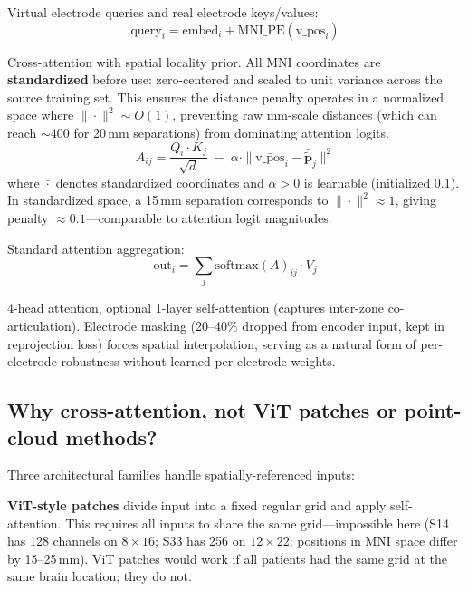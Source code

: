 \documentclass[11pt,letterpaper]{article}
\newcommand{\bfp}{\mathbf{p}}
\begin{document}
Virtual electrode queries and real electrode keys/values:
\begin{equation}
\text{query}_i = \text{embed}_i + \text{MNI\_PE}(\text{v\_pos}_i)
\end{equation}

Cross-attention with spatial locality prior. All MNI coordinates are \textbf{standardized} before use: zero-centered and scaled to unit variance across the source training set. This ensures the distance penalty operates in a normalized space where $\|\cdot\|^2 \sim O(1)$, preventing raw mm-scale distances (which can reach ${\sim}400$ for 20\,mm separations) from dominating attention logits.
\begin{equation}
\boxed{A_{ij} = \frac{Q_i \cdot K_j}{\sqrt{d}} \;-\; \alpha \cdot \|\bar{\text{v\_pos}}_i - \bar{\tilde{\bfp}}_j\|^2}
\end{equation}
where $\bar{\cdot}$ denotes standardized coordinates and $\alpha > 0$ is learnable (initialized 0.1). In standardized space, a 15\,mm separation corresponds to $\|\cdot\|^2 \approx 1$, giving penalty ${\approx}0.1$---comparable to attention logit magnitudes.

Standard attention aggregation:
\begin{equation}
\text{out}_i = \sum_j \text{softmax}(A)_{ij} \cdot V_j
\end{equation}

4-head attention, optional 1-layer self-attention (captures inter-zone co-articulation). Electrode masking (20--40\% dropped from encoder input, kept in reprojection loss) forces spatial interpolation, serving as a natural form of per-electrode robustness without learned per-electrode weights.

\subsection{Why cross-attention, not ViT patches or point-cloud methods?}\label{sec:architecture-alternatives}

Three architectural families handle spatially-referenced inputs:

\textbf{ViT-style patches} divide input into a fixed regular grid and apply self-attention. This requires all inputs to share the same grid---impossible here (S14 has 128 channels on $8{\times}16$; S33 has 256 on $12{\times}22$; positions in MNI space differ by 15--25\,mm). ViT patches would work if all patients had the same grid at the same brain location; they do not.
\end{document}
